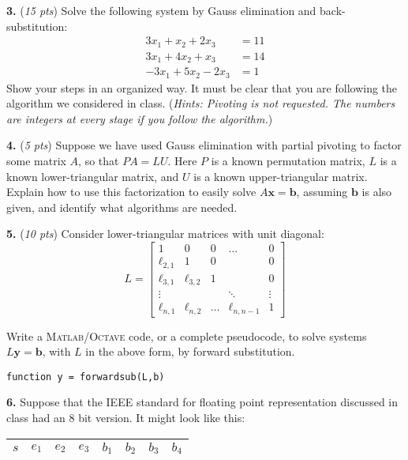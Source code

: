 \documentclass[11pt]{amsart}
\newcommand{\bb}{\mathbf{b}}
\newcommand{\bx}{\mathbf{x}}
\newcommand{\by}{\mathbf{y}}
\newcommand{\Matlab}{\textsc{Matlab}\xspace}
\newcommand{\Octave}{\textsc{Octave}\xspace}
\newcommand{\prob}[1]{\bigskip\noindent\textbf{#1.} }
\newcommand{\pts}[1]{(\emph{#1 pts})}
\newcommand{\probpts}[2]{\prob{#1} \pts{#2} \quad}
\begin{document}
\newpage
\probpts{3}{15}  Solve the following system by Gauss elimination and back-substitution:
\begin{align*}
 3 x_1 +   x_2 + 2 x_3 &= 11 \\
 3 x_1 + 4 x_2 +   x_3 &= 14 \\
-3 x_1 + 5 x_2 - 2 x_3 &= 1
\end{align*}
Show your steps in an organized way.  It must be clear that you are following the algorithm we considered in class.  (\emph{Hints:  Pivoting is \emph{not} requested.  The numbers are integers at every stage if you follow the algorithm.})

\vfill


\newpage
\probpts{4}{5}  Suppose we have used Gauss elimination with partial pivoting to factor some matrix $A$, so that $PA=LU$.  Here $P$ is a known permutation matrix, $L$ is a known lower-triangular matrix, and $U$ is a known upper-triangular matrix.  Explain how to use this factorization to easily solve $A \bx = \bb$, assuming $\bb$ is also given, and identify what algorithms are needed.
\vspace{2.5in}


\probpts{5}{10}  Consider lower-triangular matrices with unit diagonal:
$$L = \begin{bmatrix}
    1          & 0          & 0        & \dots  & 0 \\
    \ell_{2,1} & 1          & 0        &        & 0 \\
    \ell_{3,1} & \ell_{3,2} & 1        &        & 0 \\
    \vdots     &            &          & \ddots & \vdots \\
    \ell_{n,1} & \ell_{n,2} & \dots    & \ell_{n,n-1} & 1 \end{bmatrix}$$

\noindent Write a \Matlab/\Octave code, or a complete pseudocode, to solve systems $L\by=\bb$, with $L$ in the above form, by forward substitution.

\bigskip
\noindent
\texttt{function y = forwardsub(L,b)}
\vfill


\newpage
\prob{6}  Suppose that the IEEE standard for floating point representation discussed in class had an 8 bit version.  It might look like this:

\medskip\large
\begin{center}
\begin{tabular}{|c|c|c|c|c|c|c|c|} \hline
$s$ & $e_1$ & $e_2$ & $e_3$ & $b_1$ & $b_2$ & $b_3$ & $b_4$ \\ \hline
\end{tabular}
\end{center}
\medskip\normalsize
\end{document}
